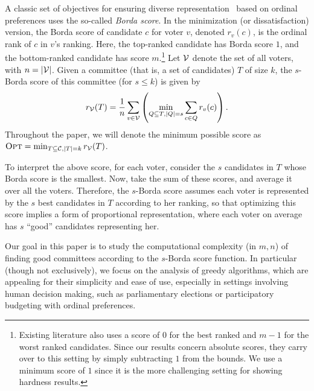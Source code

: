 A classic set of objectives for ensuring diverse representation~\cite{BrillFST19} based on ordinal preferences uses the so-called \emph{Borda score}. In the minimization (or dissatisfaction) version, the Borda score of candidate $c$ for voter $v$, denoted $r_v(c)$, is the ordinal rank of $c$ in $v$'s ranking. Here, the top-ranked candidate has Borda score $1$, and the bottom-ranked candidate has score $m$.\footnote{Existing literature also uses a score of $0$ for the best ranked and $m-1$ for the worst ranked candidates. Since our results concern absolute scores, they carry over to this setting by simply subtracting $1$ from the bounds. We use a minimum score of $1$ since it is the more challenging setting for showing hardness results.}  Let $\mathcal{V}$ denote the set of all voters, with $n = |\mathcal{V}|$. Given a committee (that is, a set of candidates) $T$ of size $k$, the $s$-Borda score of this committee (for $s \le k$) is given by
\begin{equation}
\label{eq:sborda}
r_{\mathcal{V}}(T) = \frac{1}{n} \sum_{v \in \mathcal{V}} \left(\min_{Q \subseteq T, |Q| = s} \sum_{c \in Q} r_v(c)\right).
\end{equation}
Throughout the paper, we will denote the minimum possible score as ${\normalfont\textsc{Opt}} = \min_{T \subseteq \mathcal{C}, |T| = k} r_{\mathcal{V}}(T)$.

To interpret the above score, for each voter, consider the $s$ candidates in $T$ whose Borda score is the smallest. Now, take the sum of these scores, and average it over all the voters. Therefore, the $s$-Borda score assumes each voter is represented by the $s$ best candidates in $T$ according to her ranking, so that optimizing this score implies a form of proportional representation, where each voter on average has $s$ ``good'' candidates representing her. %

Our goal in this paper is to study the computational complexity (in $m, n$) of finding good committees according to the $s$-Borda score function. In particular (though not exclusively), we focus on the analysis of greedy algorithms, which are appealing for their simplicity and ease of use, especially in settings involving human decision making, such as parliamentary elections or participatory budgeting with ordinal preferences. 



